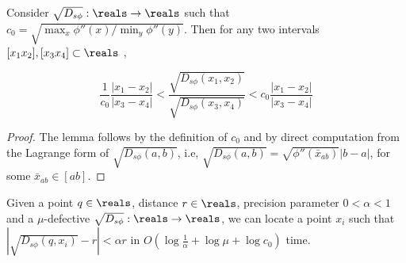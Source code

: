 \documentclass[11pt]{myclass}
\newcommand{\sbreg}{\ensuremath{D_{s\phi}}}
\begin{document}
\begin{lemma}\label{ratio}
Consider  $\sqrt{\sbreg} : \reals \to \reals$ such that $c_0 = \sqrt{\max_x \phi''(x) / \min_y \phi''(y)}$. Then for any two intervals $[x_1 x_2] ,[x_3 x_4] \subset \reals$ , 

\begin{equation}
\frac{1}{c_0} \frac{|x_1 - x_2| }{ |x_3 - x_4|} < \frac{\sqrt{\sbreg(x_1, x_2)} }{ \sqrt{\sbreg(x_3,x_4)}} < c_0 
\frac{ |x_1 - x_2| }{ |x_3 - x_4|} 
\end{equation}

\begin{proof}
The lemma follows by the definition of $c_0$ and by direct computation from the Lagrange form of $\sqrt{\sbreg(a,b)}$, i.e, $\sqrt{\sbreg(a,b)} = \sqrt{\phi''(\bar{x}_{ab})} |b -a|$, for some 
$\bar {x}_{ab} \in [ab]$.
\end{proof}

\end{lemma}

\begin{lemma}\label{approxnum}
Given a point $q \in \reals$,  distance $r \in \reals$, precision parameter $0 <\alpha < 1$ and a $\mu$-defective $\sqrt{\sbreg} : \reals \to \reals$, we can locate a  point $x_i$ such that $|\sqrt{\sbreg(q,x_i)} - r| <  \alpha r$ in  $O(\log \frac{1}{\alpha} + \log \mu +  \log c_0)$ time.
\end{lemma}
\end{document}

